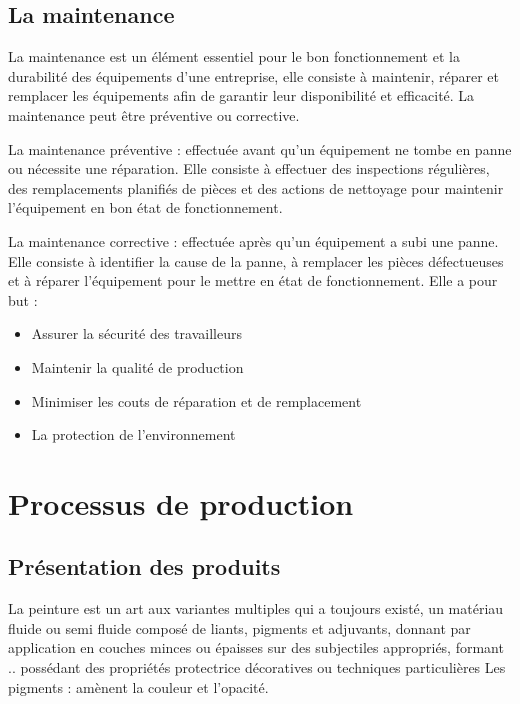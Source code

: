 \documentclass[20pt,a4paper]{report}
\begin{document}
 \newpage
		\begin{large}
		\section{La maintenance}
La maintenance est un élément essentiel pour le bon fonctionnement et la durabilité des équipements d’une entreprise, elle consiste à maintenir, réparer et remplacer les équipements afin de garantir leur disponibilité et efficacité. La maintenance peut être préventive ou corrective.

La maintenance préventive : effectuée avant qu’un équipement ne tombe en panne ou nécessite une réparation. Elle consiste à effectuer des inspections régulières, des remplacements planifiés de pièces et des actions de nettoyage pour maintenir l’équipement en bon état de fonctionnement.

La maintenance corrective : effectuée après qu’un équipement a subi une panne. Elle consiste à identifier la cause de la panne, à remplacer les pièces défectueuses et à réparer l’équipement pour le mettre en état de fonctionnement.
Elle a pour but :

			\begin{itemize}
			\item Assurer la sécurité des travailleurs
			\item Maintenir la qualité de production
			\item Minimiser les couts de réparation et de remplacement
			\item La protection de l’environnement
			\end{itemize}

	\newpage
	
	\chapter{Processus de production}
	
	\newpage

		\section{Présentation des produits}
La peinture est un art aux variantes multiples qui a toujours existé, un matériau fluide ou semi fluide composé de liants, pigments et adjuvants, donnant par application en couches minces ou épaisses sur des subjectiles appropriés, formant .. possédant des propriétés protectrice décoratives ou techniques particulières 
Les pigments : amènent la couleur et l’opacité.


\end{large}
\end{document}
